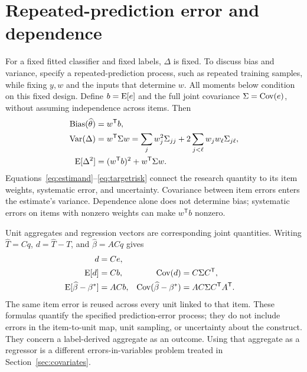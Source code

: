 \section{Repeated-prediction error and dependence}\label{app:prediction}
For a fixed fitted classifier and fixed labels, $\Delta$ is fixed. To discuss
bias and variance, specify a repeated-prediction process, such as repeated
training samples, while fixing $y,w$ and the inputs that determine $w$.
All moments below
condition on this fixed design. Define $b=\operatorname{E}[e]$ and the full joint covariance
$\Sigma=\operatorname{Cov}(e)$, without assuming independence across items. Then
\begin{align}
 \operatorname{Bias}(\widehat\theta)&=w^{\mathsf T}b,\notag\\
 \operatorname{Var}(\Delta)&=w^{\mathsf T}\Sigma w
 =\sum_jw_j^2\Sigma_{jj}
   +2\sum_{j<\ell}w_jw_\ell\Sigma_{j\ell},\label{eq:targetmoments}\\
 \operatorname{E}[\Delta^2]&=(w^{\mathsf T}b)^2+w^{\mathsf T}\Sigma w.
 \label{eq:targetrisk}
\end{align}
Equations~\eqref{eq:estimand}--\eqref{eq:targetrisk} connect the research quantity
to its item weights, systematic error, and uncertainty. Covariance between
item errors enters the estimate's variance. Dependence alone does not determine
bias; systematic errors on items with nonzero weights can make
$w^{\mathsf T}b$ nonzero.

Unit aggregates and regression vectors are corresponding joint quantities.
Writing $\widehat T=Cq$, $d=\widehat T-T$, and $\widehat\beta=ACq$ gives
\begin{align}
 d&=Ce,\label{eq:identity}\\
 \operatorname{E}[d]&=Cb, & \operatorname{Cov}(d)&=C\Sigma C^{\mathsf T},\label{eq:moments}\\
 \operatorname{E}[\widehat\beta-\beta^*]&=ACb,
 &\operatorname{Cov}(\widehat\beta-\beta^*)&=AC\Sigma C^{\mathsf T}A^{\mathsf T}.
 \label{eq:regression}
\end{align}
The same item error is reused across every unit linked to that item. These
formulas quantify the specified prediction-error process; they do not include
errors in the item-to-unit map, unit sampling, or uncertainty about the
construct. They concern a label-derived aggregate as an outcome. Using that
aggregate as a regressor is a different
errors-in-variables problem treated in Section~\ref{sec:covariates}.

